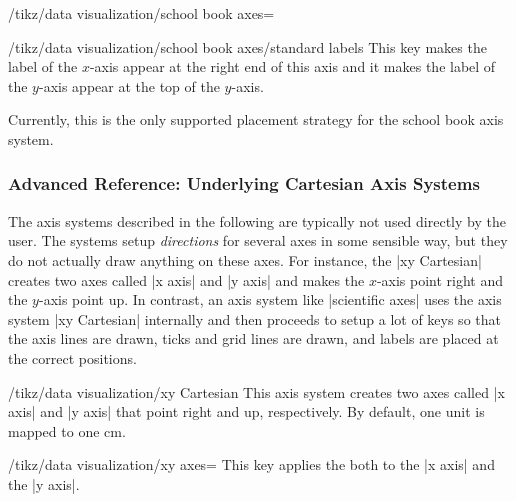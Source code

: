 \begin{key}{/tikz/data visualization/school book axes=}
    \begin{key}{/tikz/data visualization/school book axes/standard labels}
        This key makes the label of the $x$-axis appear at the right end of
        this axis and it makes the label of the $y$-axis appear at the top of
        the $y$-axis.

        Currently, this is the only supported placement strategy for the school
        book axis system.
\begin{codeexample}[preamble={\usetikzlibrary{datavisualization.formats.functions}}]
\end{codeexample}
    \end{key}
\end{key}


\subsubsection{Advanced Reference: Underlying Cartesian Axis Systems}

The axis systems described in the following are typically not used directly by
the user. The systems setup \emph{directions} for several axes in some sensible
way, but they do not actually draw anything on these axes. For instance, the
|xy Cartesian| creates two axes called |x axis| and |y axis| and makes the
$x$-axis point right and the $y$-axis point up. In contrast, an axis system
like |scientific axes| uses the axis system |xy Cartesian| internally and then
proceeds to setup a lot of keys so that the axis lines are drawn, ticks and
grid lines are drawn, and labels are placed at the correct positions.

\begin{key}{/tikz/data visualization/xy Cartesian}
    This axis system creates two axes called |x axis| and |y axis| that point
    right and up, respectively. By default, one unit is mapped to one cm.
\begin{codeexample}[preamble={\usetikzlibrary{datavisualization.formats.functions}}]
\end{codeexample}

    \begin{key}{/tikz/data visualization/xy axes=}
        This key applies the  both to the |x axis| and the
        |y axis|.
    \end{key}
\end{key}

